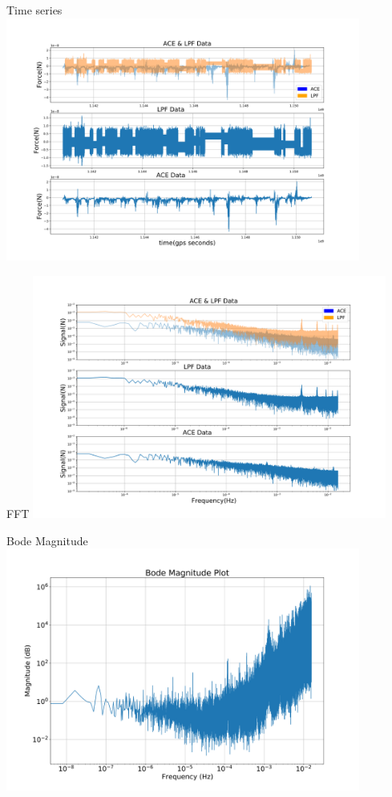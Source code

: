 \documentclass[aspectratio=169,xcolor=dvipsnames]{beamer}
\begin{document}
\begin{frame}{Time series}
    \centering
    \includegraphics[height=8cm]{TimeDomain_Comparison_ACEvLPF-1.png}
\end{frame}
\begin{frame}{FFT}
    \centering
    \includegraphics[height=8cm]{ACE_and_LPF_Loglo-1.png}
\end{frame}
\iffalse
\begin{frame}{Bode Magnitude}
    \centering
    \includegraphics[height=8cm]{Bode_Magnitude_Plot-1.png}
\end{frame}
\end{document}
